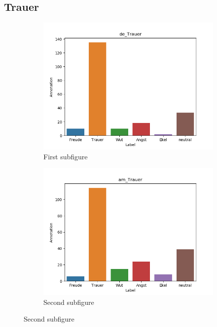 \documentclass[11pt,a4paper,headsepline,twoside,toc=bibliography]{scrreprt}
\begin{document}
\subsection{Trauer}

\begin{figure}[t!] %
	\begin{subfigure}{0.48\textwidth}
		\includegraphics[width=\linewidth]{plots/de_Trauer.png}
		\caption{First subfigure} \label{fig:de_T}
	\end{subfigure}\hspace*{\fill}
	\begin{subfigure}{0.48\textwidth}
		\includegraphics[width=\linewidth]{plots/am_Trauer.png}
		\caption{Second subfigure} \label{fig:am_T}
	\end{subfigure}
	

\end{figure}
\end{document}

